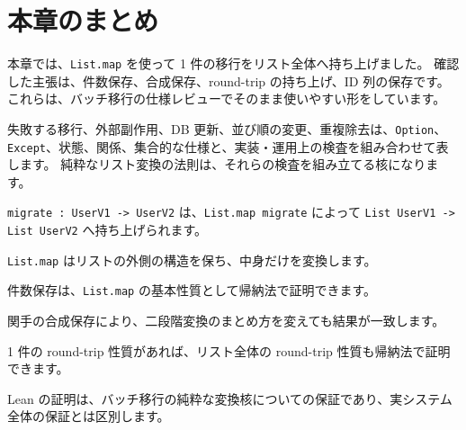 \section{本章のまとめ}

本章では、\texttt{List.map} を使って 1 件の移行をリスト全体へ持ち上げました。
確認した主張は、件数保存、合成保存、round-trip の持ち上げ、ID 列の保存です。
これらは、バッチ移行の仕様レビューでそのまま使いやすい形をしています。

失敗する移行、外部副作用、DB 更新、並び順の変更、重複除去は、\texttt{Option}、\texttt{Except}、状態、関係、集合的な仕様と、実装・運用上の検査を組み合わせて表します。
純粋なリスト変換の法則は、それらの検査を組み立てる核になります。

\texttt{migrate : UserV1 -> UserV2} は、\texttt{List.map migrate} によって \texttt{List UserV1 -> List UserV2} へ持ち上げられます。

\texttt{List.map} はリストの外側の構造を保ち、中身だけを変換します。

件数保存は、\texttt{List.map} の基本性質として帰納法で証明できます。

関手の合成保存により、二段階変換のまとめ方を変えても結果が一致します。

1 件の round-trip 性質があれば、リスト全体の round-trip 性質も帰納法で証明できます。

Lean の証明は、バッチ移行の純粋な変換核についての保証であり、実システム全体の保証とは区別します。
